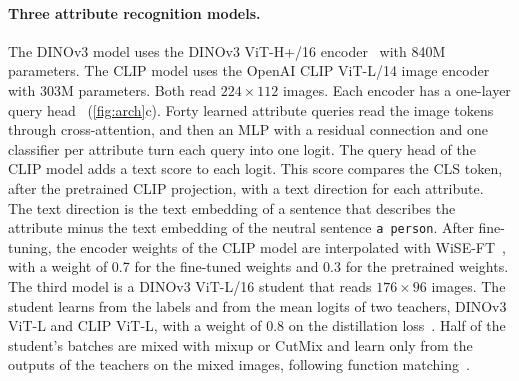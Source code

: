 \documentclass[10pt,twocolumn,letterpaper]{article}
\begin{document}
\paragraph{Three attribute recognition models.} The DINOv3 model uses the DINOv3 ViT-H+/16 encoder~\cite{dinov3} with 840M parameters. The CLIP model uses the OpenAI CLIP ViT-L/14 image encoder~\cite{clip} with 303M parameters. Both read $224\times112$ images. Each encoder has a one-layer query head~\cite{q2l,mldecoder} (\cref{fig:arch}c). Forty learned attribute queries read the image tokens through cross-attention, and then an MLP with a residual connection and one classifier per attribute turn each query into one logit. The query head of the CLIP model adds a text score to each logit. This score compares the CLS token, after the pretrained CLIP projection, with a text direction for each attribute. The text direction is the text embedding of a sentence that describes the attribute minus the text embedding of the neutral sentence \texttt{a person}. After fine-tuning, the encoder weights of the CLIP model are interpolated with WiSE-FT~\cite{wiseft}, with a weight of 0.7 for the fine-tuned weights and 0.3 for the pretrained weights. The third model is a DINOv3 ViT-L/16 student that reads $176\times96$ images. The student learns from the labels and from the mean logits of two teachers, DINOv3 ViT-L and CLIP ViT-L, with a weight of 0.8 on the distillation loss~\cite{hinton}. Half of the student's batches are mixed with mixup or CutMix and learn only from the outputs of the teachers on the mixed images, following function matching~\cite{patient}.
\end{document}
